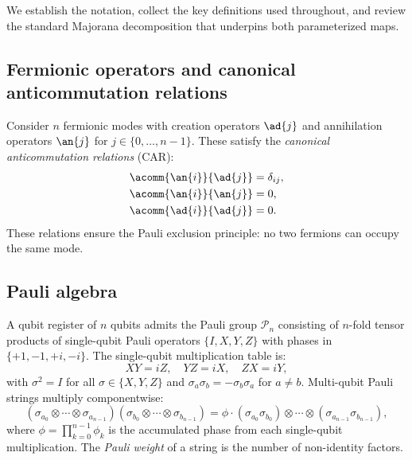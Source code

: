 
We establish the notation, collect the key definitions used throughout,
and review the standard Majorana decomposition that underpins both
parameterized maps.

\subsection{Fermionic operators and canonical anticommutation relations}

Consider $n$ fermionic modes with creation operators $\ad{j}$ and
annihilation operators $\an{j}$ for $j \in \{0, \ldots, n{-}1\}$.
These satisfy the \emph{canonical anticommutation relations} (CAR):
\begin{align}
  \acomm{\an{i}}{\ad{j}} &= \delta_{ij}, \label{eq:car1} \\
  \acomm{\an{i}}{\an{j}} &= 0, \label{eq:car2} \\
  \acomm{\ad{i}}{\ad{j}} &= 0. \label{eq:car3}
\end{align}
These relations ensure the Pauli exclusion principle: no two fermions
can occupy the same mode.

\subsection{Pauli algebra}

A qubit register of $n$ qubits admits the Pauli group $\mathcal{P}_n$
consisting of $n$-fold tensor products of single-qubit Pauli operators
$\{I, X, Y, Z\}$ with phases in $\{+1, -1, +i, -i\}$.  The
single-qubit multiplication table is:
\begin{equation}
  XY = iZ, \quad YZ = iX, \quad ZX = iY,
  \label{eq:pauli-products}
\end{equation}
with $\sigma^2 = I$ for all $\sigma \in \{X, Y, Z\}$ and
$\sigma_a \sigma_b = -\sigma_b \sigma_a$ for $a \neq b$.
Multi-qubit Pauli strings multiply componentwise:
\begin{equation}
  (\sigma_{a_0} \otimes \cdots \otimes \sigma_{a_{n-1}})
  (\sigma_{b_0} \otimes \cdots \otimes \sigma_{b_{n-1}})
  = \phi \cdot
  (\sigma_{a_0}\sigma_{b_0}) \otimes \cdots \otimes
  (\sigma_{a_{n-1}}\sigma_{b_{n-1}}),
  \label{eq:pauli-mult}
\end{equation}
where $\phi = \prod_{k=0}^{n-1} \phi_k$ is the accumulated phase from
each single-qubit multiplication.  The \emph{Pauli weight} of a string
is the number of non-identity factors.

